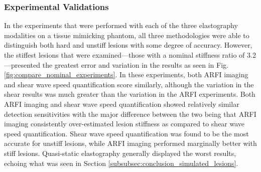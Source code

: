 		\subsubsection{Experimental Validations}
			In the experiments that were performed with each of the three elastography modalities on a tissue mimicking phantom, all three methodologies were able to distinguish both hard and unstiff lesions with some degree of accuracy. However, the stiffest lesions that were examined---those with a nominal stiffness ratio of 3.2---presented the greatest error and variation in the results as seen in Fig. \ref{fig:compare_nominal_experiments}. In these experiments, both ARFI imaging and shear wave speed quantification score similarly, although the variation in the shear results was much greater than the variation in the ARFI experiments. Both ARFI imaging and shear wave speed quantification showed relatively similar detection sensitivities with the major difference between the two being that ARFI imaging consistently over-estimated lesion stiffness as compared to shear wave speed quantification. Shear wave speed quantification was found to be the most accurate for unstiff lesions, while ARFI imaging performed marginally better with stiff lesions. Quasi-static elastography generally displayed the worst results, echoing what was seen in Section \ref{subsubsec:conclusion_simulated_lesions}.

